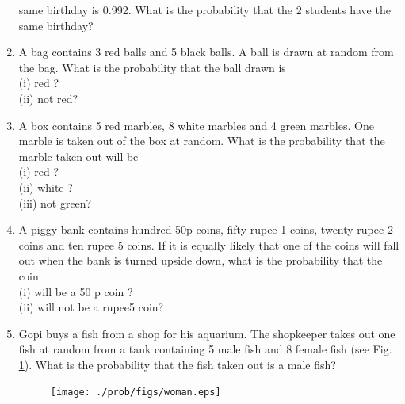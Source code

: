 \begin{enumerate}[label=\arabic*.,ref=\thesubsection.\theenumi]
same birthday is 0.992. What is the probability that the 2 students have the same
birthday?
\item A bag contains 3 red balls and 5 black balls. A ball is drawn at random from the bag.
What is the probability that the ball drawn is\\ 
(i) red ? \\
(ii) not red?
\item A box contains 5 red marbles, 8 white marbles and 4 green marbles. One marble is taken
out of the box at random. What is the probability that the marble taken out will be\\
(i) red ?\\
(ii) white ? \\
(iii) not green?
\item A piggy bank contains hundred 50p coins, fifty rupee 1 coins, twenty rupee 2 coins and ten rupee 5 coins. If it is equally likely that one of the coins will fall out when the bank is turned upside down, what is the probability that the coin \\
(i) will be a 50 p coin ?\\
(ii) will not be a rupee5 coin?
\item Gopi buys a fish from a shop for his aquarium. The
shopkeeper takes out one fish at random from a
tank containing 5 male fish and 8 female fish (see
Fig. \ref{fig:prob_121}). What is the probability that the fish taken
out is a male fish?
\begin{figure}[!ht]
\centering
\texttt{[image: ./prob/figs/woman.eps]}
\caption{}
\label{fig:prob_121}
\end{figure}
\\
\solution



\end{enumerate}
